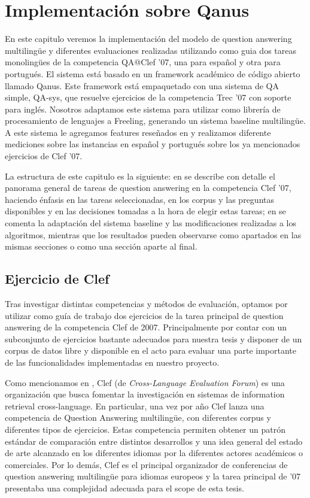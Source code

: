 \chapter{Implementación sobre Qanus}
\label{chap:qanus}
En este capitulo veremos la implementación del modelo de question answering multilingüe y diferentes evaluaciones realizadas utilizando como guia dos tareas monolingües de la competencia QA@Clef '07, una para español y otra para portugués. El sistema está basado en un framework académico de código abierto llamado Qanus. Este framework está empaquetado con una sistema de QA simple, QA-sys, que resuelve ejercicios de la competencia Trec '07 con soporte para inglés. Nosotros adaptamos este sistema para utilizar como librería de procesamiento de lenguajes a Freeling, generando un sistema baseline multilingüe. A este sistema le agregamos features reseñados en  y realizamos diferente mediciones sobre las instancias en español y portugués sobre los ya mencionados ejercicios de Clef '07.

La estructura de este capitulo es la siguiente: en  se describe con detalle el panorama general de tareas de question answering en la competencia Clef '07, haciendo énfasis en las tareas seleccionadas, en los corpus y las preguntas disponibles y en las decisiones tomadas a la hora de elegir estas tareas; en  se comenta la adaptación del sistema baseline y las modificaciones realizadas a los algoritmos, {\color{red}mientras que los resultados pueden observarse como apartados en las mismas secciones o como una sección aparte al final}.

\section{Ejercicio de Clef}
\label{sec:ejecicio-de-clef}
Tras investigar distintas competencias y métodos de evaluación, optamos por utilizar como guía de trabajo dos ejercicios de la tarea principal de question answering de la competencia Clef de 2007. Principalmente por contar con un subconjunto de ejercicios bastante adecuados para nuestra tesis y disponer de un corpus de datos libre y disponible en el acto para evaluar una parte importante de las funcionalidades implementadas en nuestro proyecto. 

Como mencionamos en , Clef (de \textit{Cross-Language Evaluation Forum}) es una organización que busca fomentar la investigación en sistemas de information retrieval cross-language. En particular, una vez por año Clef lanza una competencia de Question Answering multilingüe, con diferentes corpus y diferentes tipos de ejercicios. Estas competencia permiten obtener un patrón estándar de comparación entre distintos desarrollos y una idea general del estado de arte alcanzado en los diferentes idiomas por la diferentes actores académicos o {\color{red}comerciales}. Por lo demás, Clef es el principal organizador de conferencias de question answering multilingüe para idiomas europeos y la tarea principal de '07 presentaba una complejidad adecuada para el scope de esta tesis.

